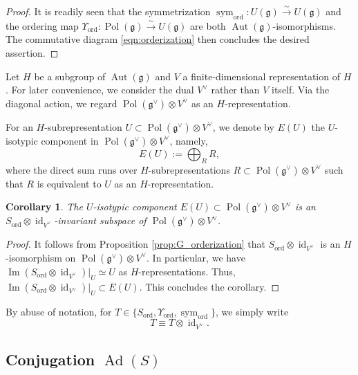 \documentclass[a4paper,11pt,reqno]{amsart}
\newcommand{\frakg}{\mathfrak{g}}
\newcommand{\0}{{\bf 0}}
\newcommand{\1}{{\bf 1}}
\DeclareMathOperator{\Ad}{Ad}
\DeclareMathOperator{\Pol}{Pol}
\DeclareMathOperator{\id}{id}
\renewcommand\Im{\operatorname{Im}}
\newcommand{\ord}{{\mathrm{ord}}}
\DeclareMathOperator{\sym}{sym}
\DeclareMathOperator{\Aut}{Aut}
\theoremstyle{plain}
\newtheorem{corollary}[equation]{Corollary}
\theoremstyle{definition}
\numberwithin{equation}{section}
\theoremstyle{definition}
\begin{document}
\begin{proof}
It is readily seen that the symmetrization 
$\sym_{\ord} \colon U(\frakg) \stackrel{\sim}{\to} U(\frakg)$
and the ordering map $\Upsilon_{\ord} \colon \Pol(\frakg) \stackrel{\sim}{\to} U(\frakg)$ are both $\Aut(\frakg)$-isomorphisms. 
The commutative diagram \eqref{eqn:orderization} then concludes 
the desired assertion.
\end{proof}

Let $H$ be a subgroup of $\Aut(\frakg)$ and $V$ a finite-dimensional 
representation of $H$. For later convenience, 
we consider the dual $V^\vee$ rather than $V$ itself.
Via the diagonal action, we regard $\Pol(\frakg^\vee) \otimes V^\vee$
as an $H$-representation.

For an $H$-subrepresentation $U \subset \Pol(\frakg^\vee) \otimes V^\vee$,
we denote by $E(U)$ the $U$-isotypic component in 
$\Pol(\frakg^\vee) \otimes V^\vee$, namely,
\begin{equation*}
E(U):=\bigoplus_{R}  R,
\end{equation*}
where the direct sum runs over 
$H$-subrepresentations $R \subset \Pol(\frakg^\vee) \otimes V^\vee$
such that $R$ is equivalent to $U$ as an $H$-representation.

\begin{corollary}\label{cor:G_orderization}
The $U$-isotypic component $E(U) \subset \Pol(\frakg^\vee) \otimes V^\vee$
is  an $S_{\ord}\otimes \id_{V^\vee}$-invariant subspace of $\Pol(\frakg^\vee)\otimes V^\vee$.
\end{corollary}

\begin{proof}
It follows from Proposition \ref{prop:G_orderization} that 
$S_{\ord}\otimes \id_{V^\vee}$ is an $H$-isomorphism on 
$\Pol(\frakg^\vee)\otimes V^\vee$.
In particular, we have $\Im(S_{\ord}\otimes \id_{V^\vee})\vert_{U} \simeq U$ 
as $H$-representations. 
Thus, $\Im(S_{\ord}\otimes \id_{V^\vee})\vert_{U}  \subset E(U)$.
This concludes the corollary.
\end{proof}

By abuse of notation, for $T \in \{S_{\ord}, \Upsilon_{\ord}, \sym_\ord\}$,
we simply write
\begin{equation*}
T\equiv T \otimes \id_{V^\vee}.
\end{equation*}

\subsection{Conjugation \texorpdfstring{$\Ad(S)$}{Ad(S)}}
\label{sec:ConT}
\end{document}
